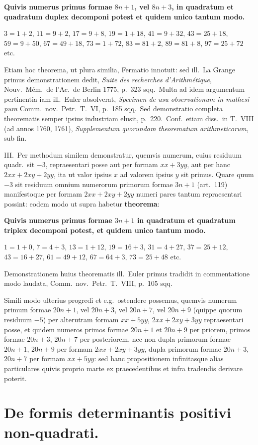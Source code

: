 \documentclass[12pt,a4paper]{article}
\theoremstyle{plain}
\theoremstyle{definition}
\theoremstyle{remark}
\begin{document}
\textbf{Quivis numerus primus formae $8n+1$, vel $8n+3$, in quadratum et quadratum duplex decomponi potest et quidem unico tantum modo.}

$3=1+2$, $11=9+2$, $17=9+8$, $19=1+18$, $41=9+32$, $43=25+18$, $59=9+50$, $67=49+18$, $73=1+72$, $83=81+2$, $89=81+8$, $97=25+72$ etc.

Etiam hoc theorema, ut plura similia, Fermatio innotuit: sed ill.\ La Grange primus demonstrationem dedit, \textit{Suite des recherches d'Arithmétique}, Nouv.\ Mém.\ de l'Ac.\ de Berlin 1775, p.\ 323 sqq.\ Multa ad idem argumentum pertinentia iam ill.\ Euler absolverat, \textit{Specimen de usu observationum in mathesi pura} Comm.\ nov.\ Petr.\ T.\ VI, p.\ 185 sqq.\ Sed demonstratio completa theorematis semper ipsius industriam elusit, p.\ 220.\ Conf.\ etiam diss.\ in T.\ VIII (ad annos 1760, 1761), \textit{Supplementum quorundam theorematum arithmeticorum}, sub fin.

III.\ Per methodum similem demonstratur, quemvis numerum, cuius residuum quadr.\ sit $-3$, repraesentari posse aut per formam $xx+3yy$, aut per hanc $2xx+2xy+2yy$, ita ut valor ipsius $x$ ad valorem ipsius $y$ sit primus. Quare quum $-3$ sit residuum omnium numerorum primorum formae $3n+1$ (art.\ 119) manifestoque per formam $2xx+2xy+2yy$ numeri pares tantum repraesentari possint: eodem modo ut supra habetur \textbf{theorema}:

\textbf{Quivis numerus primus formae $3n+1$ in quadratum et quadratum triplex decomponi potest, et quidem unico tantum modo.}

$1=1+0$, $7=4+3$, $13=1+12$, $19=16+3$, $31=4+27$, $37=25+12$, $43=16+27$, $61=49+12$, $67=64+3$, $73=25+48$ etc.

Demonstrationem huius theorematis ill.\ Euler primus tradidit in commentatione modo laudata, Comm.\ nov.\ Petr.\ T.\ VIII, p.\ 105 sqq.

Simili modo ulterius progredi et e.g.\ ostendere possemus, quemvis numerum primum formae $20n+1$, vel $20n+3$, vel $20n+7$, vel $20n+9$ (quippe quorum residuum $-5$) per alterutram formam $xx+5yy$, $2xx+2xy+3yy$ repraesentari posse, et quidem numeros primos formae $20n+1$ et $20n+9$ per priorem, primos formae $20n+3$, $20n+7$ per posteriorem, nec non dupla primorum formae $20n+1$, $20n+9$ per formam $2xx+2xy+3yy$, dupla primorum formae $20n+3$, $20n+7$ per formam $xx+5yy$: sed hanc propositionem infinitasque alias particulares quivis proprio marte ex praecedentibus et infra tradendis derivare poterit.

\section*{De formis determinantis positivi non-quadrati.}
\end{document}
